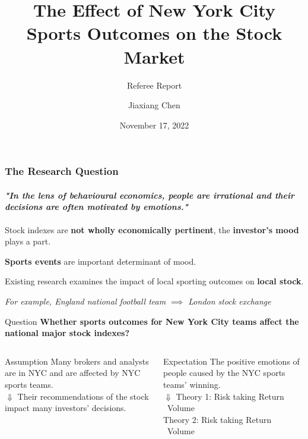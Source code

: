 \documentclass[]{beamer}
\title[Referee Report]{The Effect of New York City Sports Outcomes on the Stock Market\citep{p1}}
\subtitle{Referee Report}
\author[10763756]{Jiaxiang Chen}
\date[November 17, 2022]{November 17, 2022}
\begin{document}
\begin{frame}
\titlepage 
\end{frame}

\begin{frame}
	\frametitle{The Research Question}
        \framesubtitle{\tiny{\textit{"In the lens of behavioural economics, people are irrational and their decisions are often motivated by emotions."}}}

         \begin{enumerate}
         \small
            \item \footnotesize{Stock indexes are \textbf{\alert{not wholly economically pertinent}}, the \textbf{\alert{investor's mood}} plays a part.\vskip 0.05cm
            \item \textbf{\alert{Sports events}} are important determinant of mood.\vskip 0.05cm
            \item Existing research examines the impact of local sporting outcomes on \textbf{\alert{local stock}}.}
            \textit{\tiny{For example, England national football team $\implies$ London stock exchange \citep{p2}}}
      \end{enumerate}
         
	\begin{block}{Question}
        \textbf{\large{{Whether sports outcomes for New York City teams affect the national major stock indexes?}}}
        \end{block}

    \begin{columns}
            \begin{block}{\small{Assumption}}
                \scriptsize{ Many brokers and analysts are in NYC and are affected by NYC sports teams.\\
                 \hspace{10em}\textbf{$\Downarrow$}
                 \hspace{10em}Their recommendations of the stock impact many investors' decisions.}
            \end{block}
               
            \begin{block}{\small{Expectation}}
                 \scriptsize{The positive emotions of people caused by the NYC sports teams' winning.\\
                 \hspace{10em}\textbf{$\Downarrow$}
                 \hspace{10em}Theory 1: Risk taking \uparrow Return \uparrow\ Volume \uparrow\ \\ 
                 Theory 2: Risk taking \downarrow Return \downarrow\ Volume \downarrow\ }
            \end{block}
     
     \end{columns}
 \end{frame}
\end{document}

